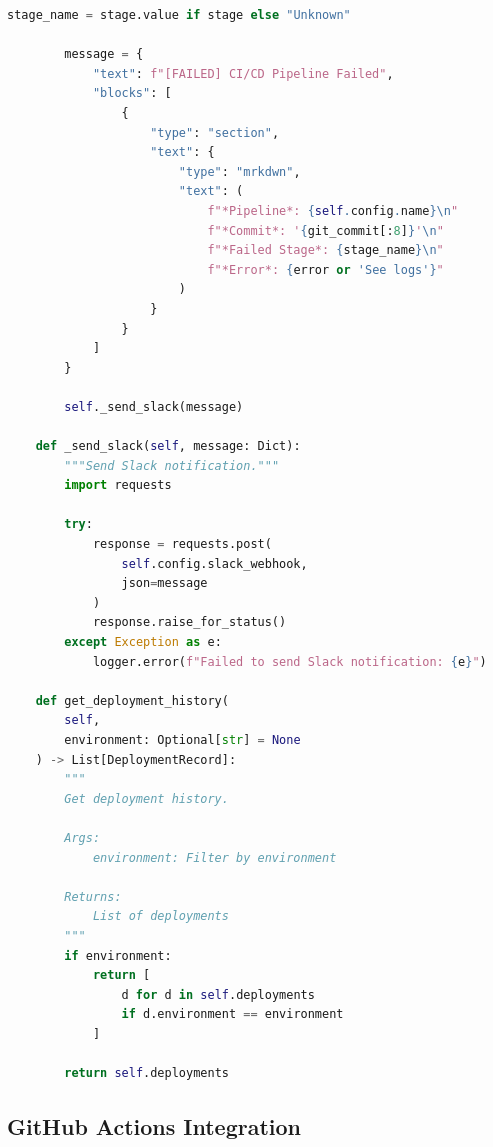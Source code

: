 \begin{lstlisting}[language=Python, caption={Comprehensive CI/CD Framework}]
        stage_name = stage.value if stage else "Unknown"

        message = {
            "text": f"[FAILED] CI/CD Pipeline Failed",
            "blocks": [
                {
                    "type": "section",
                    "text": {
                        "type": "mrkdwn",
                        "text": (
                            f"*Pipeline*: {self.config.name}\n"
                            f"*Commit*: '{git_commit[:8]}'\n"
                            f"*Failed Stage*: {stage_name}\n"
                            f"*Error*: {error or 'See logs'}"
                        )
                    }
                }
            ]
        }

        self._send_slack(message)

    def _send_slack(self, message: Dict):
        """Send Slack notification."""
        import requests

        try:
            response = requests.post(
                self.config.slack_webhook,
                json=message
            )
            response.raise_for_status()
        except Exception as e:
            logger.error(f"Failed to send Slack notification: {e}")

    def get_deployment_history(
        self,
        environment: Optional[str] = None
    ) -> List[DeploymentRecord]:
        """
        Get deployment history.

        Args:
            environment: Filter by environment

        Returns:
            List of deployments
        """
        if environment:
            return [
                d for d in self.deployments
                if d.environment == environment
            ]

        return self.deployments
\end{lstlisting}

\subsection{GitHub Actions Integration}

